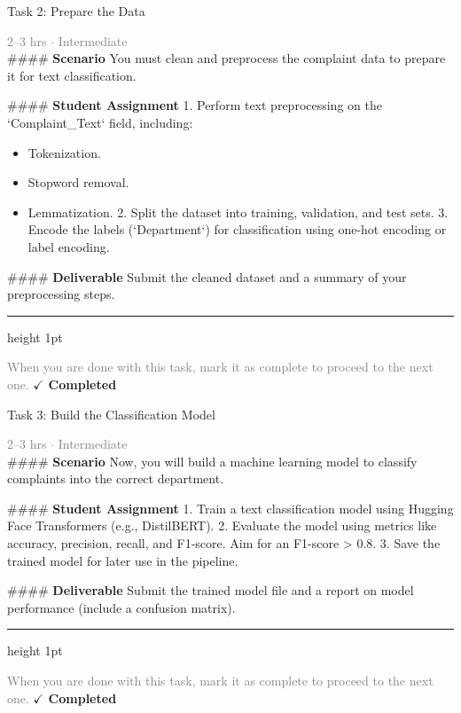 \documentclass[10pt,a4paper]{article}
\begin{document}
\begin{taskbox}{Task 2: Prepare the Data}

    {\small \textcolor{gray}{2--3 hrs $\cdot$ Intermediate}}\\[12pt]

    \#\#\#\# \textbf{Scenario}  
You must clean and preprocess the complaint data to prepare it for text classification.  

\#\#\#\# \textbf{Student Assignment}  
1. Perform text preprocessing on the `Complaint\_Text` field, including:  
\begin{itemize}
    \item Tokenization.  
    \item Stopword removal.  
    \item Lemmatization.  
2. Split the dataset into training, validation, and test sets.  
3. Encode the labels (`Department`) for classification using one-hot encoding or label encoding.  
\end{itemize}

\#\#\#\# \textbf{Deliverable}  
Submit the cleaned dataset and a summary of your preprocessing steps.\par

    \vspace{16pt}

    \textcolor{cardBorder}{\hrule height 1pt}\vspace{8pt}

    \small \textcolor{gray}{When you are done with this task, mark it as complete to proceed to the next one.} \hfill \textbf{\textcolor{brandDark}{$\checkmark$ Completed}}

\end{taskbox}

\begin{taskbox}{Task 3: Build the Classification Model}

    {\small \textcolor{gray}{2--3 hrs $\cdot$ Intermediate}}\\[12pt]

    \#\#\#\# \textbf{Scenario}  
Now, you will build a machine learning model to classify complaints into the correct department.  

\#\#\#\# \textbf{Student Assignment}  
1. Train a text classification model using Hugging Face Transformers (e.g., DistilBERT).  
2. Evaluate the model using metrics like accuracy, precision, recall, and F1-score. Aim for an F1-score > 0.8.  
3. Save the trained model for later use in the pipeline.  

\#\#\#\# \textbf{Deliverable}  
Submit the trained model file and a report on model performance (include a confusion matrix).\par

    \vspace{16pt}

    \textcolor{cardBorder}{\hrule height 1pt}\vspace{8pt}

    \small \textcolor{gray}{When you are done with this task, mark it as complete to proceed to the next one.} \hfill \textbf{\textcolor{brandDark}{$\checkmark$ Completed}}

\end{taskbox}
\end{document}
